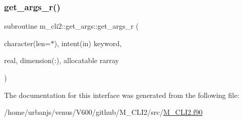 \subsubsection{\texorpdfstring{get\+\_\+args\+\_\+r()}{get\_args\_r()}}
{\footnotesize\ttfamily subroutine m\+\_\+cli2\+::get\+\_\+args\+::get\+\_\+args\+\_\+r (\begin{DoxyParamCaption}\item[{character(len=$\ast$), intent(in)}]{keyword,  }\item[{real, dimension(\+:), allocatable}]{rarray }\end{DoxyParamCaption})\hspace{0.3cm}{\ttfamily [private]}}



The documentation for this interface was generated from the following file\+:\begin{DoxyCompactItemize}
\item 
/home/urbanjs/venus/\+V600/github/\+M\+\_\+\+C\+L\+I2/src/\mbox{\hyperlink{M__CLI2_8f90}{M\+\_\+\+C\+L\+I2.\+f90}}\end{DoxyCompactItemize}
